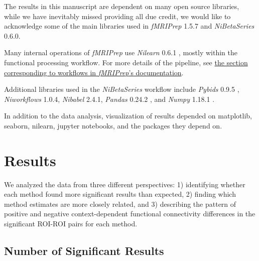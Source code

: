 \documentclass[phd,figures,tables,ackpage,abstractpage,publicabstractpage]{uithesis}
\begin{document}
The results in this manuscript are dependent on many open source
libraries, while we have inevitably missed providing all due credit,
we would like to acknowledge some of the main libraries used in 
\emph{fMRIPrep} 1.5.7\cite{fmriprep1} and \emph{NiBetaSeries} 0.6.0\cite{Kent2018}.

Many internal operations of \emph{fMRIPrep} use \emph{Nilearn} 0.6.1
\cite[RRID:SCR\_001362]{nilearn}, mostly within the functional
processing workflow. For more details of the pipeline, see
\href{https://fmriprep.readthedocs.io/en/latest/workflows.html}{the
section corresponding to workflows in \emph{fMRIPrep}'s documentation}.

Additional libraries used in the \emph{NiBetaSeries} workflow include
\emph{Pybids} 0.9.5 \cite{Yarkoni2019}, \emph{Niworkflows} 1.0.4,
\emph{Nibabel} 2.4.1, \emph{Pandas} 0.24.2 \cite{McKinney2010}, and
\emph{Numpy} 1.18.1 \cite{VanDerWalt2011, Oliphant2006}.

In addition to the data analysis, visualization of results depended
on matplotlib\cite{Hunter2007}, seaborn\cite{Waskom2020}, nilearn,
jupyter notebooks\cite{Kluyver2016a}, and the packages they depend on.

\section{Results}
We analyzed the data from three different perspectives:
1) identifying whether each method found more significant results than expected,
2) finding which method estimates are more closely related, and
3) describing the pattern of positive and negative context-dependent functional connectivity
differences in the significant ROI-ROI pairs for each method.


\subsection{Number of Significant Results}
\end{document}
